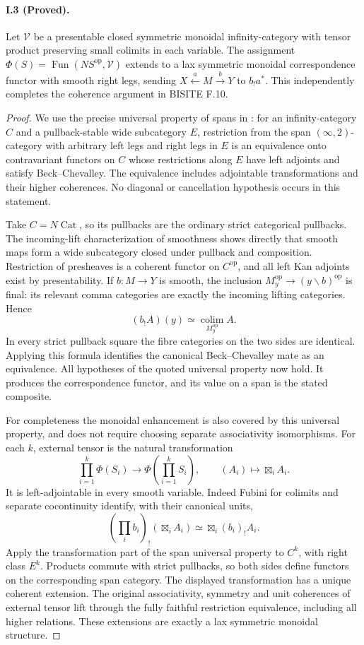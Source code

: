 \paragraph{I.3 (Proved).}
Let $\mathcal V$ be a presentable closed symmetric monoidal
infinity-category with tensor product preserving small colimits in
each variable. The assignment
$\Phi(S)=\operatorname{Fun}(NS^{\mathrm{op}},\mathcal V)$ extends to
a lax symmetric monoidal correspondence functor with smooth right
legs, sending $X\xleftarrow aM\xrightarrow bY$ to $b_!a^*$.
This independently completes the coherence argument in BISITE F.10.
\begin{proof}
We use the precise universal property of spans in \citet[Corollary 2.6(2)]{GHIJCnossenLenzRamzi2025}: for an infinity-category $C$
and a pullback-stable wide subcategory $E$, restriction from the
span $(\infty,2)$-category with arbitrary left legs and right legs
in $E$ is an equivalence onto contravariant functors on $C$ whose
restrictions along $E$ have left adjoints and satisfy Beck--Chevalley.
The equivalence includes adjointable transformations and their
higher coherences. No diagonal or cancellation hypothesis occurs
in this statement.

Take $C=N\operatorname{Cat}$, so its pullbacks are the ordinary
strict categorical pullbacks. The incoming-lift characterization
of smoothness shows directly that smooth maps form a wide
subcategory closed under pullback and composition. Restriction of
presheaves is a coherent functor on $C^{\mathrm{op}}$, and all left
Kan adjoints exist by presentability. If $b:M\to Y$ is smooth,
the inclusion
$M_y^{\mathrm{op}}\to(y\backslash b)^{\mathrm{op}}$ is final:
its relevant comma categories are exactly the incoming lifting
categories. Hence
\[
 (b_!A)(y)\simeq\operatorname*{colim}_{M_y^{\mathrm{op}}}A.
\]
In every strict pullback square the fibre categories on the two
sides are identical. Applying this formula identifies the canonical
Beck--Chevalley mate as an equivalence. All hypotheses of the
quoted universal property now hold. It produces the correspondence
functor, and its value on a span is the stated composite.

For completeness the monoidal enhancement is also covered by
this universal property, and does not require choosing separate
associativity isomorphisms. For each $k$, external tensor is the
natural transformation
\[
 \prod_{i=1}^k\Phi(S_i)\longrightarrow
 \Phi\!\left(\prod_{i=1}^kS_i\right),\qquad
 (A_i)\longmapsto\boxtimes_i A_i.
\]
It is left-adjointable in every smooth variable. Indeed Fubini
for colimits and separate cocontinuity identify, with their
canonical units,
\[
 (\textstyle\prod_i b_i)_!(\boxtimes_i A_i)
       \simeq\boxtimes_i (b_i)_!A_i.
\]
Apply the transformation part of the span universal property to
$C^k$, with right class $E^k$. Products commute with strict
pullbacks, so both sides define functors on the corresponding
span category. The displayed transformation has a unique coherent
extension. The original associativity, symmetry and unit
coherences of external tensor lift through the fully faithful
restriction equivalence, including all higher relations. These
extensions are exactly a lax symmetric monoidal structure.


\end{proof}
